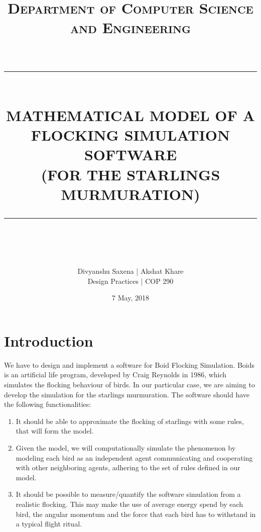 \documentclass[12pt]{report}
\newcommand{\HRule}[1]{\rule{\linewidth}{#1}}
\begin{document}
\title{ \normalfont  \textsc{Department of Computer Science and Engineering} \\[2pt]
		\\ [2.0cm]
		\HRule{0.5pt} \\
		\LARGE \textbf{\uppercase{Mathematical Model of a Flocking Simulation Software}} \\[2pt]
        \large \textbf{\uppercase{(For the Starlings Murmuration)}}
		\HRule{2pt} \\ [0.5cm]
		\normalsize \date{7 May, 2018} \vspace*{5\baselineskip}}

\date{}

\author{
		Divyanshu Saxena | Akshat Khare \\ 
		Design Practices | COP 290   \\
		 }

\maketitle
\tableofcontents
\newpage

\sectionfont{\scshape}


\section*{Introduction}
We have to design and implement a software for Boid Flocking Simulation. Boids is an artificial life program, developed by Craig Reynolds in 1986, which simulates the flocking behaviour of birds. In our particular case, we are aiming to develop the simulation for the starlings murmuration.
The software should have the following functionalities:
\begin{enumerate}
\item It should be able to approximate the flocking of starlings with some rules, that will form the model.
\item Given the model, we will computationally simulate the phenomenon by modeling each bird as an independent agent communicating and cooperating with other neighboring agents, adhering to the set of rules defined in our model.
\item It should be possible to measure/quantify the software simulation from a realistic flocking. This may make the use of average energy spend by each bird, the angular momentum and the force that each bird has to withstand in a typical flight ritual.
\end{enumerate}
\end{document}
